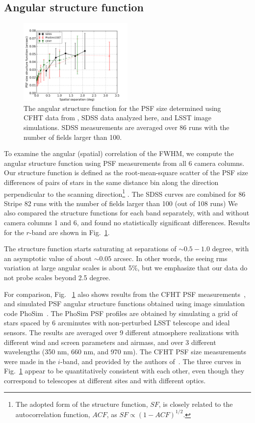 \subsection{Angular structure function} 

\begin{figure}[th]
\centering
\includegraphics[width=0.5\textwidth]{FIGURES/spatial.png}
\caption{The angular structure function for the PSF size determined using 
  CFHT data from \cite{heymans2012}, SDSS data analyzed here, and LSST image simulations. 
  SDSS measurements are averaged over 86 runs with the number of fields larger than 100. 
\label{fig:spatial}}
\end{figure}

To examine the angular (spatial) correlation of the FWHM, we compute the angular
structure function using PSF measurements from all 6 camera columns.
Our structure function is defined as the root-mean-square scatter of the PSF size 
differences of pairs of stars in the same distance bin along the direction perpendicular
to the scanning direction\footnote{The adopted form 
of the structure function, $SF$, is closely related to the autocorrelation function, $ACF$, as 
$SF \propto (1-ACF)^{1/2}$.} .
The SDSS curves are combined for 86 Stripe 82 runs with the number of fields larger than 
100 (out of 108 runs) 
We also compared the structure functions for each band
separately, with and without camera columns 1 and 6, 
and found no statistically significant differences.
Results for the $r$-band are shown in Fig.~\ref{fig:spatial}.

The structure function starts saturating at separations of
$\sim 0.5 - 1.0$ degree, with an asymptotic value of about $\sim 0.05$ arcsec.
In other words, the seeing rms variation at large angular scales is about 5\%,
but we emphasize that our data do not probe scales beyond 2.5 degree. 

For comparison, Fig. ~\ref{fig:spatial} also shows results from the CFHT PSF 
measurements~\citep{heymans2012}, and simulated PSF angular
structure functions obtained using image simulation code PhoSim~\citep{phosim}. 
The PhoSim PSF profiles are obtained by simulating a grid of stars
spaced by 6 arcminutes with non-perturbed LSST telescope and ideal sensors.
The results are averaged over 9 different atmosphere realizations with
different wind and screen parameters and airmass, and over 3 different
wavelengths (350 nm, 660 nm, and 970 nm).
The CFHT PSF size measurements were made in the $i$-band, and provided
by the authors of~\cite{heymans2012}.
The three curves in Fig.~\ref{fig:spatial} appear to be quantitatively
consistent with each other, even though they correspond to telescopes at
different sites and with different optics. 

